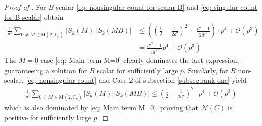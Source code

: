 \documentclass[12pt,reqno]{amsart}
\theoremstyle{plain}
\theoremstyle{definition}
\newcommand{\M}{\mathrm{M}}
\newcommand{\sN}{{\mathcal N}}
\newcommand{\sO}{{\mathcal O}}
\theoremstyle{remark}
\newcommand{\FF}{\mathbb{F}}
\begin{document}
\begin{proof}[Proof of  ]
    For $B$ scalar \eqref{eq: nonsingular count for scalar B} and \eqref{eq: singular count for B scalar} obtain 
    \begin{align*}
       \frac{1}{p^4} \sum_{0 \neq M \in \M(2, \FF_p)}|S_k(M)||S_k(MB)|&\leq\left(\left(\frac{1}{2}-\frac{1}{2d'}\right)^2 +\frac{d'-1}{2d'^2}\right)\cdot p^4 + \sO(p^3)\\
        &= \frac{d'^2-1}{4d'^2} p^4 + \sO(p^3)
    \end{align*}
    The $M=0$ case \eqref{eq: Main term M=0} clearly dominates the last expression, guaranteeing a solution for $B$ scalar for sufficiently large $p$.
    Similarly, for $B$ non-scalar, \eqref{eq: nonsingular count} and Case $2$ of subsection \ref{subsec:rank one} yield
    \begin{align*}
        \frac{1}{p^4}\sum_{0 \neq M \in \M(2, \FF_p)}|S_k(M)||S_k(MB)|\leq \left(\frac{1}{2}-\frac{1}{2d'}\right)^2\cdot p^4 + \sO(p^3)
    \end{align*}
    which is also dominated by \eqref{eq: Main term M=0}, proving that $\sN(C)$ is positive for sufficiently large $p$.
    \end{proof}
\bigskip



 
\end{document}
